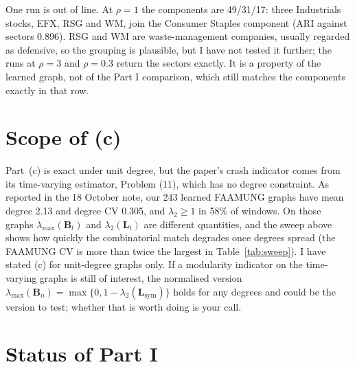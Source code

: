 \documentclass[11pt,a4paper]{article}
\newcommand{\Lap}{\mathbf{L}}
\newcommand{\Bmat}{\mathbf{B}}
\newcommand{\Lsym}{\Lap_{\mathrm{sym}}}
\theoremstyle{remark}
\begin{document}
One run is out of line. At $\rho=1$ the components are 49/31/17: three Industrials
stocks, EFX, RSG and WM, join the Consumer Staples component (ARI against sectors
0.896). RSG and WM are waste-management companies, usually regarded as defensive, so
the grouping is plausible, but I have not tested it further; the runs at $\rho=3$ and
$\rho=0.3$ return the sectors exactly. It is a property of the learned graph, not of the Part I
comparison, which still matches the components exactly in that row.

\section{Scope of (c)}\label{sec:scope}

Part~(c) is exact under unit degree, but the paper's crash indicator comes from its
time-varying estimator, Problem (11), which has no degree constraint. As reported in
the 18 October note, our 243 learned FAAMUNG graphs have mean degree 2.13 and degree
CV 0.305, and $\lambda_2\ge1$ in 58\% of windows. On those graphs
$\lambda_{\max}(\Bmat_t)$ and $\lambda_2(\Lap_t)$ are different quantities, and the
sweep above shows how quickly the combinatorial match degrades once degrees spread
(the FAAMUNG CV is more than twice the largest in Table~\ref{tab:sweep}). I have
stated (c) for unit-degree graphs only. If a modularity indicator on the time-varying
graphs is still of interest, the normalised version
$\lambda_{\max}(\Bmat_n)=\max\{0,1-\lambda_2(\Lsym)\}$ holds for any degrees and could
be the version to test; whether that is worth doing is your call.

\section{Status of Part I}\label{sec:status1}
\end{document}

